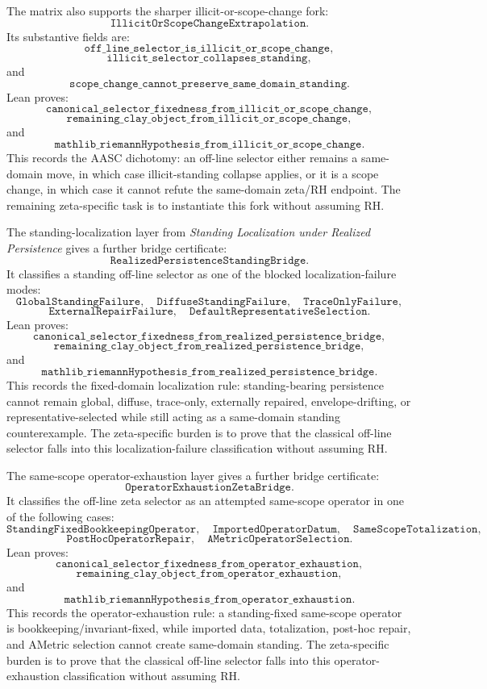 \documentclass[11pt]{article}
\begin{document}
The matrix also supports the sharper illicit-or-scope-change fork:
\[
\texttt{IllicitOrScopeChangeExtrapolation}.
\]
Its substantive fields are:
\[
\texttt{off\_line\_selector\_is\_illicit\_or\_scope\_change},
\]
\[
\texttt{illicit\_selector\_collapses\_standing},
\]
and
\[
\texttt{scope\_change\_cannot\_preserve\_same\_domain\_standing}.
\]
Lean proves:
\[
\texttt{canonical\_selector\_fixedness\_from\_illicit\_or\_scope\_change},
\]
\[
\texttt{remaining\_clay\_object\_from\_illicit\_or\_scope\_change},
\]
and
\[
\texttt{mathlib\_riemannHypothesis\_from\_illicit\_or\_scope\_change}.
\]
This records the AASC dichotomy: an off-line selector either remains a
same-domain move, in which case illicit-standing collapse applies, or it is a
scope change, in which case it cannot refute the same-domain zeta/RH endpoint.
The remaining zeta-specific task is to instantiate this fork without assuming
RH.

The standing-localization layer from \emph{Standing Localization under Realized
Persistence} gives a further bridge certificate:
\[
\texttt{RealizedPersistenceStandingBridge}.
\]
It classifies a standing off-line selector as one of the blocked
localization-failure modes:
\[
\texttt{GlobalStandingFailure},\quad
\texttt{DiffuseStandingFailure},\quad
\texttt{TraceOnlyFailure},
\]
\[
\texttt{ExternalRepairFailure},\quad
\texttt{DefaultRepresentativeSelection}.
\]
Lean proves:
\[
\texttt{canonical\_selector\_fixedness\_from\_realized\_persistence\_bridge},
\]
\[
\texttt{remaining\_clay\_object\_from\_realized\_persistence\_bridge},
\]
and
\[
\texttt{mathlib\_riemannHypothesis\_from\_realized\_persistence\_bridge}.
\]
This records the fixed-domain localization rule: standing-bearing persistence
cannot remain global, diffuse, trace-only, externally repaired,
envelope-drifting, or representative-selected while still acting as a same-domain
standing counterexample.  The zeta-specific burden is to prove that the
classical off-line selector falls into this localization-failure classification
without assuming RH.

The same-scope operator-exhaustion layer gives a further bridge certificate:
\[
\texttt{OperatorExhaustionZetaBridge}.
\]
It classifies the off-line zeta selector as an attempted same-scope operator in
one of the following cases:
\[
\texttt{StandingFixedBookkeepingOperator},\quad
\texttt{ImportedOperatorDatum},\quad
\texttt{SameScopeTotalization},
\]
\[
\texttt{PostHocOperatorRepair},\quad
\texttt{AMetricOperatorSelection}.
\]
Lean proves:
\[
\texttt{canonical\_selector\_fixedness\_from\_operator\_exhaustion},
\]
\[
\texttt{remaining\_clay\_object\_from\_operator\_exhaustion},
\]
and
\[
\texttt{mathlib\_riemannHypothesis\_from\_operator\_exhaustion}.
\]
This records the operator-exhaustion rule: a standing-fixed same-scope operator
is bookkeeping/invariant-fixed, while imported data, totalization, post-hoc
repair, and AMetric selection cannot create same-domain standing.  The
zeta-specific burden is to prove that the classical off-line selector falls into
this operator-exhaustion classification without assuming RH.
\end{document}
